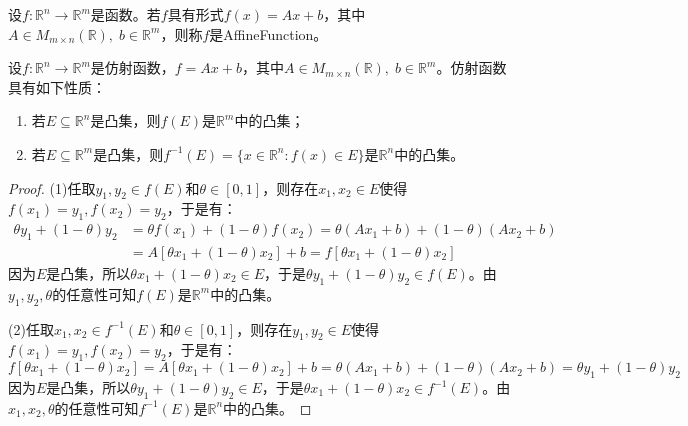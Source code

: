 \begin{definition}
	设$f:\mathbb{R}^{n}\to\mathbb{R}^{m}$是函数。若$f$具有形式$f(x)=Ax+b$，其中$A\in M_{m\times n}(\mathbb{R}),\;b\in\mathbb{R}^{m}$，则称$f$是\gls{AffineFunction}。
\end{definition}
\begin{property}\label{prop:AffineFunction}
	设$f:\mathbb{R}^{n}\to\mathbb{R}^{m}$是仿射函数，$f=Ax+b$，其中$A\in M_{m\times n}(\mathbb{R}),\;b\in\mathbb{R}^{m}$。仿射函数具有如下性质：
	\begin{enumerate}
		\item 若$E\subseteq\mathbb{R}^{n}$是凸集，则$f(E)$是$\mathbb{R}^{m}$中的凸集；
		\item 若$E\subseteq\mathbb{R}^{m}$是凸集，则$f^{-1}(E)=\{x\in\mathbb{R}^{n}:f(x)\in E\}$是$\mathbb{R}^{n}$中的凸集。
	\end{enumerate}
\end{property}
\begin{proof}
	(1)任取$y_1,y_2\in f(E)$和$\theta\in[0,1]$，则存在$x_1,x_2\in E$使得$f(x_1)=y_1,f(x_2)=y_2$，于是有：
	\begin{align*}
		\theta y_1+(1-\theta)y_2&=\theta f(x_1)+(1-\theta)f(x_2)=\theta(Ax_1+b)+(1-\theta)(Ax_2+b) \\
		&=A[\theta x_1+(1-\theta)x_2]+b=f[\theta x_1+(1-\theta)x_2]
	\end{align*}
	因为$E$是凸集，所以$\theta x_1+(1-\theta)x_2\in E$，于是$\theta y_1+(1-\theta)y_2\in f(E)$。由$y_1,y_2,\theta$的任意性可知$f(E)$是$\mathbb{R}^{m}$中的凸集。\par
	(2)任取$x_1,x_2\in f^{-1}(E)$和$\theta\in[0,1]$，则存在$y_1,y_2\in E$使得$f(x_1)=y_1,f(x_2)=y_2$，于是有：
	\begin{equation*}
		f[\theta x_1+(1-\theta)x_2]=A[\theta x_1+(1-\theta)x_2]+b=\theta(Ax_1+b)+(1-\theta)(Ax_2+b)=\theta y_1+(1-\theta)y_2
	\end{equation*}
	因为$E$是凸集，所以$\theta y_1+(1-\theta)y_2\in E$，于是$\theta x_1+(1-\theta)x_2\in f^{-1}(E)$。由$x_1,x_2,\theta$的任意性可知$f^{-1}(E)$是$\mathbb{R}^{n}$中的凸集。
\end{proof}

